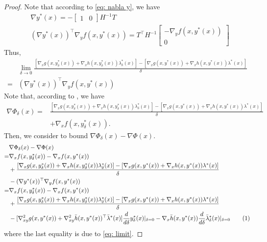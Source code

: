 \documentclass{article}
\newcommand\numberthis{\addtocounter{equation}{1}\tag{\theequation}}
\theoremstyle{plain}
\theoremstyle{definition}
\theoremstyle{remark}
\begin{document}
\begin{proof}
Note that according to \eqref{eq: nabla y}, we have
\begin{align*}
    &\nabla y^*(x)=-\begin{bmatrix}
1 & 0
\end{bmatrix} H^{-1} T\\
&(\nabla y^*(x))^\top \nabla_y f(x,y^*(x))=T^\top H^{-1}\begin{bmatrix}
-\nabla_y f(x, y^*(x)) \\ 0
\end{bmatrix}
\end{align*}
Thus,
\begin{align}\nonumber
    &\lim_{\delta\to 0}\frac{[\nabla_x g(x, y^*_\delta(x))+\nabla_x h(x, y^*_\delta(x))\lambda^*_\delta(x)]-[\nabla_x g(x, y^*(x))+\nabla_x h(x, y^*(x))\lambda^*(x)]}{\delta}\\
    =&(\nabla y^*(x))^\top \nabla_y f(x,y^*(x)) \label{eq: limit}
\end{align}
Note that, according to , we have
\begin{align*}
    \nabla \Phi_\delta(x)=&\frac{[\nabla_x g(x, y^*_\delta(x))+\nabla_x h(x, y^*_\delta(x))\lambda^*_\delta(x)]-[\nabla_x g(x, y^*(x))+\nabla_x h(x, y^*(x))\lambda^*(x)]}{\delta}\\
    &+\nabla_x f(x, y^*_\delta(x)).
\end{align*}
Then, we consider to bound $\nabla \Phi_\delta(x)-\nabla \Phi(x)$.
\begin{align*}
    &\nabla \Phi_\delta(x)-\nabla \Phi(x)\\
    =&\nabla_x f(x, y^*_\delta(x))-\nabla_x f(x, y^*(x))\\
    &+\frac{[\nabla_x g(x, y^*_\delta(x))+\nabla_x h(x, y^*_\delta(x))\lambda^*_\delta(x)]-[\nabla_x g(x, y^*(x))+\nabla_x h(x, y^*(x))\lambda^*(x)]}{\delta}\\
    &-(\nabla y^*(x))^\top \nabla_y f(x,y^*(x))\\
    =&\nabla_x f(x, y^*_\delta(x))-\nabla_x f(x, y^*(x))\\
    &+\frac{[\nabla_x g(x, y^*_\delta(x))+\nabla_x h(x, y^*_\delta(x))\lambda^*_\delta(x)]-[\nabla_x g(x, y^*(x))+\nabla_x h(x, y^*(x))\lambda^*(x)]}{\delta}\\
    &-[\nabla^2_{xy} g(x, y^*(x))+\nabla^2_{xy}\Bar{h}(x,y^*(x))^\top\Bar{\lambda}^*(x)]\frac{d}{d \delta} y^*_\delta(x)|_{\delta=0}-\nabla_x\Bar{h}(x,y^*(x))\frac{d}{d \delta} \Bar{\lambda}^*_\delta(x)|_{\delta=0} \numberthis \label{eq: delta error}
\end{align*}
where the last equality is due to \eqref{eq: limit}.


\end{proof}
\end{document}
